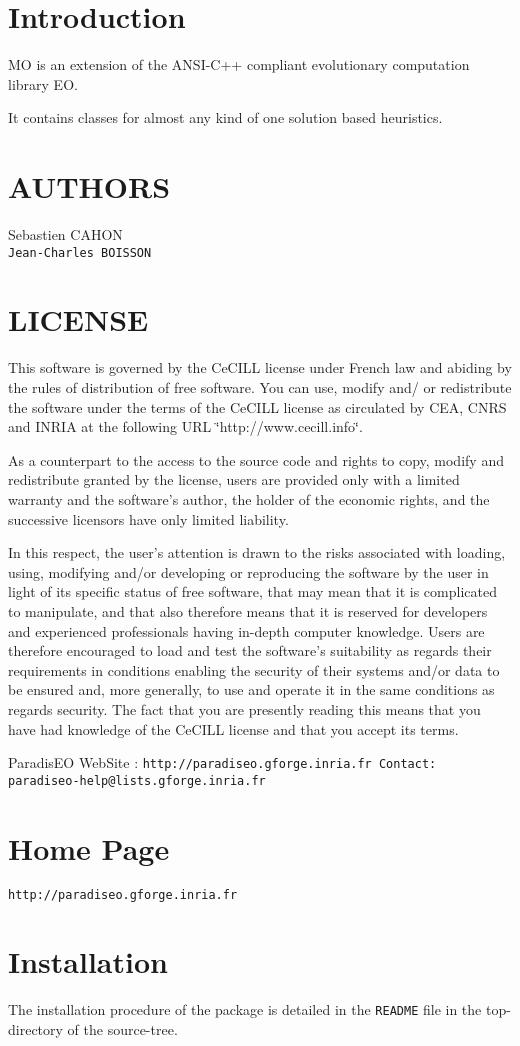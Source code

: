 \section{Introduction}\label{main_Introduction}
MO is an extension of the ANSI-C++ compliant evolutionary computation library EO. \par
 It contains classes for almost any kind of one solution based heuristics.\section{AUTHORS}\label{main_authors}
\begin{TabularC}{1}
\hline
Sebastien CAHON  \\\hline
{\tt Jean-Charles BOISSON}   \\\hline
\end{TabularC}
\section{LICENSE}\label{main_LICENSE}
This software is governed by the Ce\-CILL license under French law and abiding by the rules of distribution of free software. You can use, modify and/ or redistribute the software under the terms of the Ce\-CILL license as circulated by CEA, CNRS and INRIA at the following URL \char`\"{}http://www.cecill.info\char`\"{}.

As a counterpart to the access to the source code and rights to copy, modify and redistribute granted by the license, users are provided only with a limited warranty and the software's author, the holder of the economic rights, and the successive licensors have only limited liability.

In this respect, the user's attention is drawn to the risks associated with loading, using, modifying and/or developing or reproducing the software by the user in light of its specific status of free software, that may mean that it is complicated to manipulate, and that also therefore means that it is reserved for developers and experienced professionals having in-depth computer knowledge. Users are therefore encouraged to load and test the software's suitability as regards their requirements in conditions enabling the security of their systems and/or data to be ensured and, more generally, to use and operate it in the same conditions as regards security. The fact that you are presently reading this means that you have had knowledge of the Ce\-CILL license and that you accept its terms.

Paradis\-EO Web\-Site : \tt{http://paradiseo.gforge.inria.fr} Contact: \tt{paradiseo-help@lists.gforge.inria.fr}\section{Home Page}\label{main_Paradiseo}
{\tt http://paradiseo.gforge.inria.fr}\section{Installation}\label{main_Installation}
The installation procedure of the package is detailed in the {\tt README} file in the top-directory of the source-tree. 